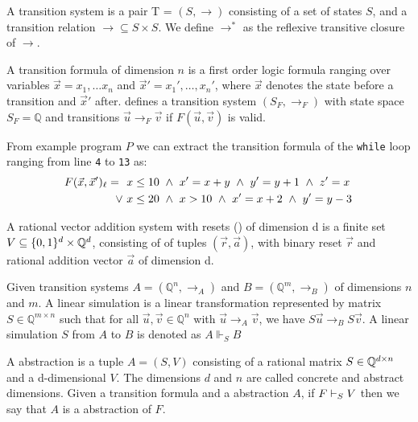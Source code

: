 \begin{mydef}
A transition system is a pair T = $(S, \rightarrow)$ consisting of a set of states $S$, and a transition relation $\rightarrow \subseteq S \times S$. We define $\rightarrow^*$ as the reflexive transitive closure of $\rightarrow$.
\end{mydef}

\begin{mydef}
A transition formula \tranFormula of dimension $n$ is a first order logic formula ranging over variables $\vec{x} = x_1, \ldots x_n$ and $\vec{x}' = x_1', \ldots, x_n'$, where $\vec{x}$ denotes the state before a transition and $\vec{x}'$ after. \tranFormula defines a transition system $(S_F, \rightarrow_F)$ with state space $S_F = \mathbb{Q}$ and transitions $\vec{u} \rightarrow_F \vec{v}$ if $F(\vec{u}, \vec{v})$ is valid.
\end{mydef}
\begin{example}
    From example program $P$ we can extract the transition formula of the \texttt{while} loop ranging from line \texttt{4} to \texttt{13} as:
    \begin{align*}
    \tranFormula_\ell =\ \  &x \leq 10 \ \land\ x' = x + y\ \land\ y' = y+1\ \land\ z' = x\ \\ \lor\ & x \leq 20\ \land\ x > 10\ \land\ x' = x + 2\ \land\ y' = y - 3
    \end{align*}
\end{example}

\begin{mydef}
A rational vector addition system with resets (\qvasr) of dimension d is a finite set $V \subseteq \{0, 1\}^d \times \mathbb{Q}^d$, consisting of of tuples $(\vec{r}, \vec{a})$, with binary reset $\vec{r}$ and rational addition vector $\vec{a}$ of dimension d.
\end{mydef}

\begin{mydef}
Given transition systems $A = (\mathbb{Q}^n, \rightarrow_A)$ and $B = (\mathbb{Q}^m, \rightarrow_B)$ of dimensions $n$ and $m$. A linear simulation is a linear transformation represented by matrix $S \in \mathbb{Q}^{m \times n}$ such that for all $\vec{u}, \vec{v} \in \mathbb{Q}^n$ with $\vec{u} \rightarrow_A \vec{v}$, we have $S\vec{u} \rightarrow_B S\vec{v}$. A linear simulation $S$ from $A$ to $B$ is denoted as $A \Vdash_{S} B$
\end{mydef}

\begin{mydef}
A \qvasr abstraction is a tuple $A = (S, V)$ consisting of a rational matrix $S \in \mathbb{Q}^{d \times n}$ and a d-dimensional \qvasr $V$. The dimensions $d$ and $n$ are called concrete and abstract dimensions.
Given a transition formula \tranFormula and a \qvasr abstraction $A$, if $F \vdash_{S} V$ then we say that $A$ is a \qvasr abstraction of $F$.
\end{mydef}

